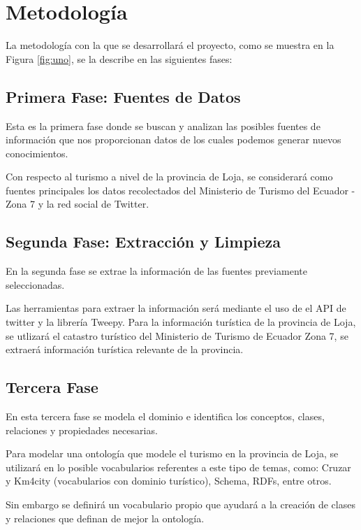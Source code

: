 \documentclass[lnbip,sechang,a4paper]{svmultln}
\begin{document}
\section{Metodología}

La metodología con la que se desarrollará el proyecto, como se muestra en la Figura \ref{fig:uno}, se la describe en las siguientes fases:

\subsection{Primera Fase: Fuentes de Datos}
Esta es la primera fase donde se buscan y analizan las posibles fuentes de información que nos proporcionan datos de los cuales podemos generar nuevos conocimientos. 

Con respecto al turismo a nivel de la provincia de Loja, se considerará como fuentes principales los datos recolectados del Ministerio de Turismo del Ecuador - Zona 7 y la red social de Twitter.

\subsection{Segunda Fase: Extracción y Limpieza}
En la segunda fase se extrae la información de las fuentes previamente seleccionadas.

Las herramientas para extraer la información será mediante el uso de el API de twitter y la librería Tweepy. Para la información turística de la provincia de Loja, se utlizará el catastro turístico del Ministerio de Turismo de Ecuador Zona 7, se extraerá información turística relevante de la provincia.


\subsection{Tercera Fase}
En esta tercera fase se modela el dominio e identifica los conceptos, clases, relaciones y propiedades necesarias.


Para modelar una ontología que modele el turismo en la provincia de Loja, se utilizará en lo posible  vocabularios referentes a este tipo de temas, como:  Cruzar y Km4city (vocabularios con dominio turístico), Schema, RDFs, entre otros.

Sin embargo se definirá un vocabulario propio que ayudará a la creación de clases y relaciones que definan de mejor la ontología. 
\end{document}
